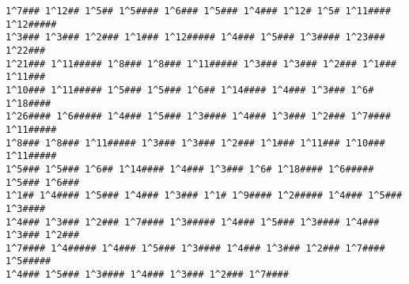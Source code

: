 \begin{@twocolumnfalse}
\begin{lstlisting}
1^7### 1^12## 1^5## 1^5#### 1^6### 1^5### 1^4### 1^12# 1^5# 1^11#### 1^12#####
1^3### 1^3### 1^2### 1^1### 1^12##### 1^4### 1^5### 1^3#### 1^23### 1^22###
1^21### 1^11##### 1^8### 1^8### 1^11##### 1^3### 1^3### 1^2### 1^1### 1^11###
1^10### 1^11##### 1^5### 1^5### 1^6## 1^14#### 1^4### 1^3### 1^6# 1^18####
1^26#### 1^6##### 1^4### 1^5### 1^3#### 1^4### 1^3### 1^2### 1^7#### 1^11#####
1^8### 1^8### 1^11##### 1^3### 1^3### 1^2### 1^1### 1^11### 1^10### 1^11#####
1^5### 1^5### 1^6## 1^14#### 1^4### 1^3### 1^6# 1^18#### 1^6##### 1^5### 1^6###
1^1## 1^4#### 1^5### 1^4### 1^3### 1^1# 1^9#### 1^2##### 1^4### 1^5### 1^3####
1^4### 1^3### 1^2### 1^7#### 1^3##### 1^4### 1^5### 1^3#### 1^4### 1^3### 1^2###
1^7#### 1^4##### 1^4### 1^5### 1^3#### 1^4### 1^3### 1^2### 1^7#### 1^5#####
1^4### 1^5### 1^3#### 1^4### 1^3### 1^2### 1^7####
\end{lstlisting}
\end{@twocolumnfalse}
